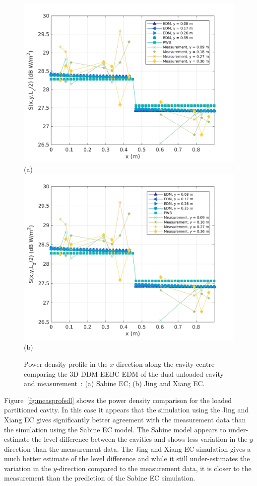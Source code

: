 \documentclass[a4paper]{article}
\numberwithin{equation}{section}
\newcounter{Figure}
\begin{document}
\begin{figure}[hp]
\begin{center}
\includegraphics[width=0.6\linewidth]{figures/DDM-EEBC_3D_DU_PowerDensityProfileXMeas}\\
{\footnotesize (a)}\\
\vspace{2mm}
\includegraphics[width=0.6\linewidth]{figures/DDM-EEBC_3D_DU_PowerDensityProfileXMeas_JX}\\
{\footnotesize (b)}\\
\vspace{-2mm}
\caption{\label{fg:measprofsdu} Power density profile in the $x$-direction along the cavity centre comparing
the 3D DDM EEBC EDM of the dual unloaded cavity and measurement~\citep{Flintoft2017b}: (a) Sabine EC; (b) Jing and Xiang EC.}
\end{center}
\end{figure}

Figure~\ref{fg:measprofsdl} shows the power density comparison for the loaded partitioned cavity. In this case it appears
that the simulation using the Jing and Xiang EC gives significantly better agreement with the measurement data than
the simulation using the Sabine EC model. The Sabine model appears to under-estimate the level difference between
the cavities and shows less variation in the $y$ direction than the measurement data. The Jing and Xiang EC simulation 
gives a much better estimate of the level difference and while it still under-estimates the variation in the $y$-direction
compared to the measurement data, it is closer to the measurement than the prediction of the Sabine EC simulation.
\end{document}
